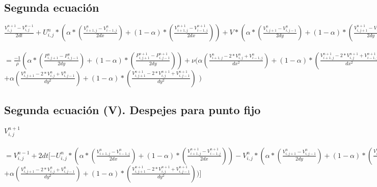 \documentclass[a4paper]{article}
\begin{document}
\subsection{Segunda ecuación}
$\frac{V^{n+1}_{i,j} - V^{n-1}_{i,j}}{2dt} + U^{n}_{i,j}*(\alpha * (\frac{V^{n}_{i+1,j} - V^{n}_{i-1,j}}{2dx}) + (1-\alpha) * (\frac{V^{n+1}_{i+1,j} - V^{n+1}_{i-1,j}}{2dx})) + V*(\alpha * (\frac{V^{n}_{i,j+1} - V^{n}_{i,j-1}}{2dy}) + (1-\alpha) * (\frac{V^{n+1}_{i,j+1} - V^{n+1}_{i,j-1}}{2dy}))$
\\
\\
$ =\frac{-1}{\rho} (\alpha * (\frac{P^{n}_{i,j+1} - P^{n}_{i,j-1}}{2dy}) + (1-\alpha) * (\frac{P^{n+1}_{i,j+1} - P^{n+1}_{i,j-1}}{2dy})) + \nu (\alpha (\frac{ V^{n}_{i+1,j} - 2*V^{n}_{i,j} + V^{n}_{i-1,j}}{dx^2}) + (1-\alpha)*(\frac{V^{n+1}_{i+1,j} - 2*V^{n+1}_{i,j} + V^{n+1}_{i-1,j}}{dx^2})$
\\
$ + \alpha (\frac{ V^{n}_{i,j+1} - 2*V^{n}_{i,j} + V^{n}_{i,j-1}}{dy^2}) + (1-\alpha)*(\frac{ V^{n+1}_{i,j+1} - 2*V^{n+1}_{i,j} + V^{n+1}_{i,j-1}}{dy^2})$
$)$





\subsection{Segunda ecuación (V). Despejes para punto fijo}
$V^{n+1}_{i,j} $
\\
\\
$ = V^{n-1}_{i,j} + 
2dt[-U^{n}_{i,j}*(\alpha * (\frac{V^{n}_{i+1,j} - V^{n}_{i-1,j}}{2dx}) + (1-\alpha) * (\frac{V^{n+1}_{i+1,j} - V^{n+1}_{i-1,j}}{2dx})) 
-V^{n}_{i,j}*(\alpha * (\frac{V^{n}_{i,j+1} - V^{n}_{i,j-1}}{2dy}) + (1-\alpha) * (\frac{V^{n+1}_{i,j+1} - V^{n+1}_{i,j-1}}{2dy})) - \frac{1}{\rho} (\alpha * (\frac{P^{n}_{i,j+1} - P^{n}_{i,j-1}}{2dy}) + (1-\alpha) * (\frac{P^{n+1}_{i,j+1} - P^{n+1}_{i,j-1}}{2dy})) + \nu (\alpha (\frac{ V^{n}_{i+1,j} - 2*V^{n}_{i,j} + V^{n}_{i-1,j}}{dx^2}) + (1-\alpha)*(\frac{V^{n+1}_{i+1,j} - 2*V^{n+1}_{i,j} + V^{n+1}_{i-1,j}}{dx^2})$
\\
$ + \alpha (\frac{ V^{n}_{i,j+1} - 2*V^{n}_{i,j} + V^{n}_{i,j-1}}{dy^2}) + (1-\alpha)*(\frac{ V^{n+1}_{i,j+1} - 2*V^{n+1}_{i,j} + V^{n+1}_{i,j-1}}{dy^2}))]$
\end{document}
